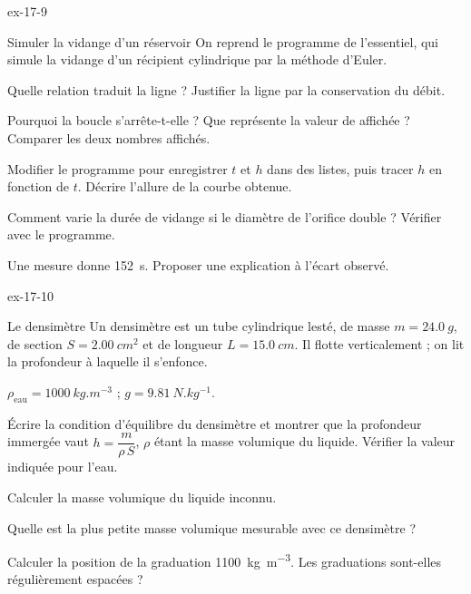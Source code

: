\begin{blocLivre}{ex-17-9}
\begin{exercice}[2]{Simuler la vidange d'un réservoir}
On reprend le programme de l'essentiel, qui simule la vidange d'un récipient cylindrique par la méthode d'Euler.
\begin{questions}
\item {}Quelle relation traduit la ligne  ? Justifier la ligne
 par la conservation du débit.
\item Pourquoi la boucle s'arrête-t-elle ? Que représente la valeur de  affichée ? Comparer les deux nombres
affichés.
\item Modifier le programme pour enregistrer $t$ et $h$ dans des listes, puis tracer $h$ en fonction de $t$. Décrire
l'allure de la courbe obtenue.
\item Comment varie la durée de vidange si le diamètre de l'orifice double ? Vérifier avec le programme.
\item Une mesure donne \qty{152}{s}. Proposer une explication à l'écart observé.
\end{questions}
\end{exercice}
\end{blocLivre}
\begin{blocLivre}{ex-17-10}
\begin{exercice}[2]{Le densimètre}
Un densimètre est un tube cylindrique lesté, de masse $m=\qty{24,0}{g}$, de section $S=\qty{2,00}{cm^2}$ et de longueur
$L=\qty{15,0}{cm}$. Il flotte verticalement ; on lit la profondeur à laquelle il s'enfonce.
\begin{donnees}
$\rho_\mathrm{eau}=\qty{1000}{kg.m^{-3}}$ ; $g=\qty{9,81}{N.kg^{-1}}$.
\end{donnees}
\begin{questions}
\item Écrire la condition d'équilibre du densimètre et montrer que la profondeur immergée vaut $h=\dfrac{m}{\rho\,S}$,
$\rho$ étant la masse volumique du liquide. Vérifier la valeur indiquée pour l'eau.
\item Calculer la masse volumique du liquide inconnu.
\item Quelle est la plus petite masse volumique mesurable avec ce densimètre ?
\item Calculer la position de la graduation \qty{1100}{kg.m^{-3}}. Les graduations sont-elles régulièrement espacées ?
\end{questions}
\end{exercice}
\end{blocLivre}
